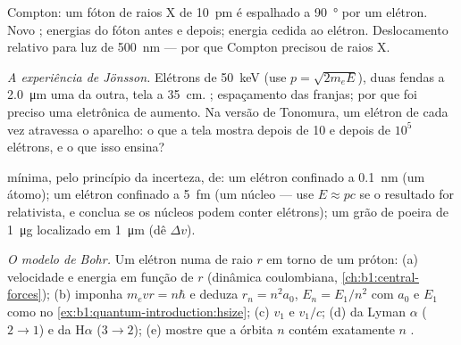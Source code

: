 \begin{exercise}[$\star\star$]\label{exo:b1:quantum-introduction:6}
Compton: um fóton de raios X de \qty{10}{pm} é espalhado a \qty{90}{\degree} por um
elétron. Novo ; energias do fóton antes e depois; energia
cedida ao elétron. Deslocamento relativo para luz de \qty{500}{nm} --- por que
Compton precisou de raios X.
\end{exercise}

\begin{exercise}[$\star\star$]\label{exo:b1:quantum-introduction:7}
\emph{A experiência de Jönsson.} Elétrons de \qty{50}{keV} (use $p =
\sqrt{2m_eE}$), duas fendas a \qty{2.0}{\micro m} uma da outra, tela a
\qty{35}{cm}. ; espaçamento das franjas; por que foi preciso uma 
eletrônica de aumento. Na versão de Tonomura, um elétron de cada vez atravessa
o aparelho: o que a tela mostra depois de 10 e depois de $10^5$ elétrons,
e o que isso ensina?
\end{exercise}

\begin{exercise}[$\star\star$]\label{exo:b1:quantum-introduction:8}
 mínima, pelo princípio da incerteza, de: um
elétron confinado a \qty{0.1}{nm} (um átomo); um elétron confinado a
\qty{5}{fm} (um núcleo --- use $E \approx pc$ se o resultado for
relativista, e conclua se os núcleos podem conter elétrons); um
grão de poeira de \qty{1}{\micro g} localizado em \qty{1}{\micro m} (dê $\Delta v$).
\end{exercise}

\begin{exercise}[$\star\star$]\label{exo:b1:quantum-introduction:9}
\emph{O modelo de Bohr.} Um elétron numa  de raio $r$ em torno de um
próton: (a) velocidade e energia em função de $r$ (dinâmica coulombiana,
\cref{ch:b1:central-forces}); (b) imponha $m_evr = n\hbar$ e deduza
$r_n = n^2a_0$, $E_n = E_1/n^2$ com $a_0$ e $E_1$ como no
\cref{ex:b1:quantum-introduction:hsize}; (c) $v_1$ e $v_1/c$; (d)
 da Lyman $\alpha$ ($2 \to 1$) e da H$\alpha$ ($3 \to 2$);
(e) mostre que a órbita $n$ contém exatamente $n$ .
\end{exercise}

